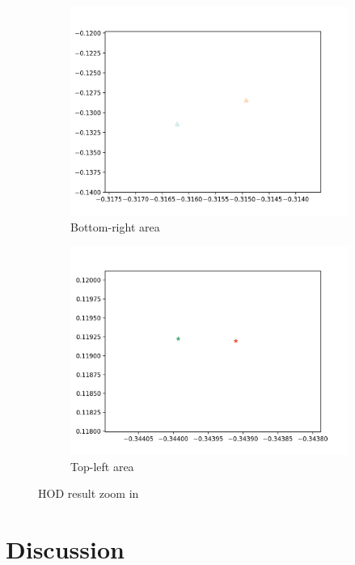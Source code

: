 \documentclass[10pt]{article}
\begin{document}
\begin{figure}[H]
    \centering
    \begin{subfigure}[h]{0.4\textwidth}
        \includegraphics[width=\linewidth]{ms_hod_1}
        \caption{Bottom-right area}
    \end{subfigure}
    \begin{subfigure}[h]{0.4\textwidth}
        \includegraphics[width=\linewidth]{ms_hod_2}
        \caption{Top-left area}
    \end{subfigure}%
    \caption{HOD result zoom in}
\end{figure}

\section{Discussion}



\end{document}
